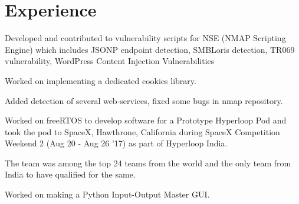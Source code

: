 \documentclass[]{deedy-resume-openfont}
\begin{document}
\begin{minipage}[t]{0.66\textwidth} 


\section{Experience}

\vspace{\topsep} %
\begin{tightemize}
\item Developed and contributed to vulnerability scripts for NSE (NMAP Scripting Engine) which includes JSONP endpoint detection, SMBLoris detection, TR069 vulnerability, WordPress Content Injection Vulnerabilities
\item Worked on implementing a dedicated cookies library.
\item Added detection of several web-services, fixed some bugs in nmap repository.
\end{tightemize}
\sectionsep

\begin{tightemize}
\item Worked on freeRTOS to develop software for a Prototype Hyperloop Pod and took the pod to SpaceX, Hawthrone, California during SpaceX Competition Weekend 2 (Aug 20 - Aug 26 '17) as part of Hyperloop India.
\item The team was among the top 24 teams from the world and the only team from India to have qualified for the same.
\end{tightemize}
\sectionsep

\begin{tightemize}
\item Worked on making a Python Input-Output Master GUI.
\end{tightemize}
\sectionsep


\end{minipage}
\end{document}
